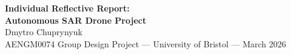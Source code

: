 \documentclass[11pt,a4paper]{article}
\begin{document}
\begin{center}
  {\LARGE\bfseries Individual Reflective Report:\\[3pt]
   Autonomous SAR Drone Project}\\[12pt]
  {\large Dmytro Chuprynyuk}\\[4pt]
  {\normalsize AENGM0074 Group Design Project --- University of Bristol --- March 2026}
\end{center}

\vspace{8pt}







\printbibliography[heading=bibintoc,title={References}]
\end{document}
